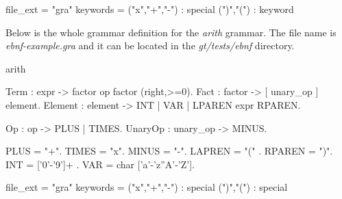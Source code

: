\begin{gt}
file_ext = "gra"
keywords = 
	("x","+","-") : special
	(")","(") : keyword
\end{gt} 
%
Below is the whole grammar definition for the \textit{arith} grammar. The file name is \textit{ebnf-example.gra} and it can 
be located in the \textit{gt/tests/ebnf} directory.\\
%
%
\begin{gt}
arith

Term : expr -> factor { op factor }(right,>=0).
Fact : factor -> [ unary_op ] element.
Element : element -> INT | VAR | LPAREN expr RPAREN.

Op : op -> PLUS | TIMES.
UnaryOp : unary_op -> MINUS.

PLUS = "+".
TIMES = "x".
MINUS = "-".
LAPREN = "(" .
RPAREN = ")".
INT = {{ ['0'-'9']+ }}.
VAR = char {{ ['a'-'z''A'-'Z']}}.

file_ext = "gra"
keywords = 
	("x","+","-") : special
	(")","(") : special
\end{gt} 




